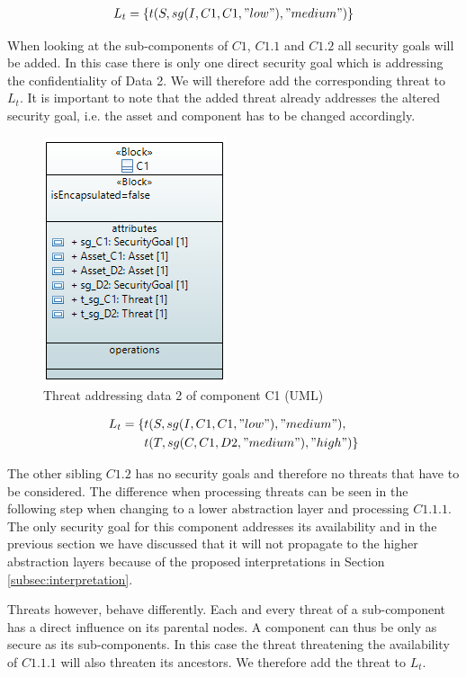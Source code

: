 \begin{align*}
L_t = \{t(S, sg(I,C1,C1,"low"), "medium")\}
\end{align*}

When looking at the sub-components of $C1$, $C1.1$ and $C1.2$ all security goals will be added. In this case there is only one direct security goal which is addressing the confidentiality of Data 2. We will therefore add the corresponding threat to $L_t$. It is important to note that the added threat already addresses the altered security goal, i.e. the asset and component has to be changed accordingly.

\begin{figure}[H]
\centering
\includegraphics[scale=0.9]{pictures/block_c1_threat_d2}
\caption{Threat addressing data 2 of component C1 (UML)}
\end{figure}

\begin{align*}
L_t = \{&t(S, sg(I,C1,C1,"low"), "medium"), \\
&t(T, sg(C,C1,D2,"medium"), "high")
\}
\end{align*}

The other sibling $C1.2$ has no security goals and therefore no threats that have to be considered. The difference when processing threats can be seen in the following step when changing to a lower abstraction layer and processing $C1.1.1$. The only security goal for this component addresses its availability and in the previous section we have discussed that it will not propagate to the higher abstraction layers because of the proposed interpretations in Section \ref{subsec:interpretation}. 

Threats however, behave differently. Each and every threat of a sub-component has a direct influence on its parental nodes. A component can thus be only as secure as its sub-components. In this case the threat threatening the availability of $C1.1.1$ will also threaten its ancestors. We therefore add the threat to $L_t$.

